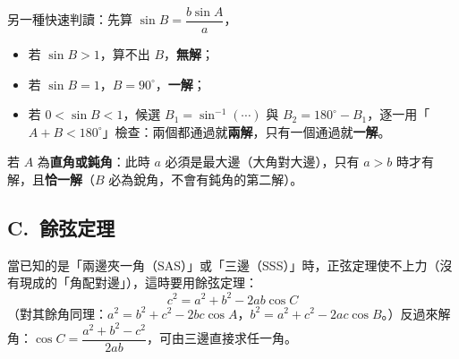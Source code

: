 \documentclass[11pt]{article}
\begin{document}
另一種快速判讀：先算 $\sin B=\dfrac{b\sin A}{a}$，
\begin{itemize}\setlength{\itemsep}{1pt}
\item 若 $\sin B>1$，算不出 $B$，\textbf{無解}；
\item 若 $\sin B=1$，$B=90^\circ$，\textbf{一解}；
\item 若 $0<\sin B<1$，候選 $B_1=\sin^{-1}(\cdots)$ 與 $B_2=180^\circ-B_1$，逐一用「$A+B<180^\circ$」檢查：兩個都通過就\textbf{兩解}，只有一個通過就\textbf{一解}。
\end{itemize}
若 $A$ 為\textbf{直角或鈍角}：此時 $a$ 必須是最大邊（大角對大邊），只有 $a>b$ 時才有解，且\textbf{恰一解}（$B$ 必為銳角，不會有鈍角的第二解）。


\subsection*{\sffamily C.\ 餘弦定理}

當已知的是「兩邊夾一角（SAS）」或「三邊（SSS）」時，正弦定理使不上力（沒有現成的「角配對邊」），這時要用餘弦定理：
$$\boxed{\;c^2=a^2+b^2-2ab\cos C\;}$$
（對其餘角同理：$a^2=b^2+c^2-2bc\cos A$，$b^2=a^2+c^2-2ac\cos B$。）反過來解角：$\cos C=\dfrac{a^2+b^2-c^2}{2ab}$，可由三邊直接求任一角。
\end{document}
